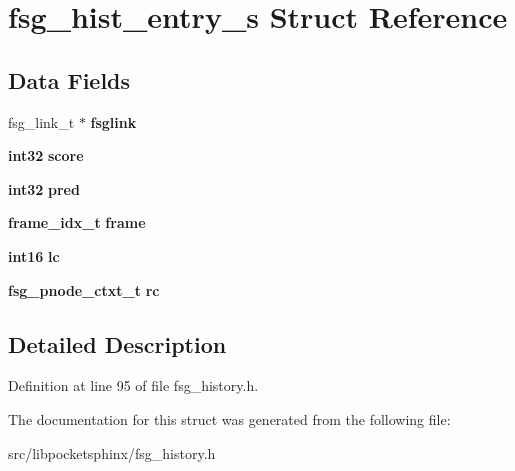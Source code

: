 \section{fsg\-\_\-hist\-\_\-entry\-\_\-s \-Struct \-Reference}
\label{structfsg__hist__entry__s}
\subsection*{\-Data \-Fields}
\begin{DoxyCompactItemize}
\item 
fsg\-\_\-link\-\_\-t $\ast$ {\bfseries fsglink}\label{structfsg__hist__entry__s_a0bf8f80477f77cbfe5e29bf0de5d58bd}

\item 
{\bf int32} {\bfseries score}\label{structfsg__hist__entry__s_a45889a875c3146359f2c8019d7c6f534}

\item 
{\bf int32} {\bfseries pred}\label{structfsg__hist__entry__s_a5fefa055f6b5a6ac976a2a51df426c65}

\item 
{\bf frame\-\_\-idx\-\_\-t} {\bfseries frame}\label{structfsg__hist__entry__s_a0788236d846e280b10c8a88a8ae2181c}

\item 
{\bf int16} {\bfseries lc}\label{structfsg__hist__entry__s_aa3a777338202f23085fb0b445cdb1528}

\item 
{\bf fsg\-\_\-pnode\-\_\-ctxt\-\_\-t} {\bfseries rc}\label{structfsg__hist__entry__s_a328d8e1d005360b77b722d1c284b0dc9}

\end{DoxyCompactItemize}


\subsection{\-Detailed \-Description}


\-Definition at line 95 of file fsg\-\_\-history.\-h.



\-The documentation for this struct was generated from the following file\-:\begin{DoxyCompactItemize}
\item 
src/libpocketsphinx/fsg\-\_\-history.\-h\end{DoxyCompactItemize}
